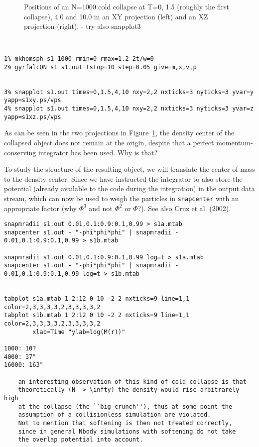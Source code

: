 {\begin{figure}[htb]
\caption[Cold Collapse of an N=1000 system]
{Positions of an N=1000 cold collapse at T=0, 1.5 (roughly
the first collapse), 4.0 and 10.0 in an XY projection (left) 
and an XZ projection (right). - try also snapplot3 }
\label{f:s1xy}
\end{figure}

\footnotesize\begin{verbatim}


1% mkhomsph s1 1000 rmin=0 rmax=1.2 2t/w=0
2% gyrfalcON s1 s1.out tstop=10 step=0.05 give=m,x,v,p


3% snapplot s1.out times=0,1.5,4,10 nxy=2,2 nxticks=3 nyticks=3 yvar=y yapp=s1xy.ps/vps
4% snapplot s1.out times=0,1.5,4,10 nxy=2,2 nxticks=3 nyticks=3 yvar=z yapp=s1xz.ps/vps

\end{verbatim}\normalsize

As can be seen in the two projections in Figure~\ref{f:s1xy}, the density center
of the collapsed object does not remain at the origin, despite that a 
perfect
momentum-conserving integrator has been used. Why is that?

To study the structure of the resulting object,
we will translate the center of mass to the density center. Since
we have instructed the integrator to also store the potential (already
available to the code during the integration) in the output data stream, which
can now be used to weigh the particles in {\tt snapcenter} with an appropriate
factor (why $\Phi^3$ and not $\Phi^2$ or $\Phi$?). See also Cruz et al. (2002).

\footnotesize\begin{verbatim}
snapmradii s1.out 0.01,0.1:0.9:0.1,0.99 > s1a.mtab
snapcenter s1.out - "-phi*phi*phi" | snapmradii - 0.01,0.1:0.9:0.1,0.99 > s1b.mtab

snapmradii s1.out 0.01,0.1:0.9:0.1,0.99 log=t > s1a.mtab
snapcenter s1.out - "-phi*phi*phi" | snapmradii - 0.01,0.1:0.9:0.1,0.99 log=t > s1b.mtab


tabplot s1a.mtab 1 2:12 0 10 -2 2 nxticks=9 line=1,1 color=2,3,3,3,3,2,3,3,3,3,2
tabplot s1b.mtab 1 2:12 0 10 -2 2 nxticks=9 line=1,1 color=2,3,3,3,3,2,3,3,3,3,2
        xlab=Time "ylab=log(M(r))"

1000: 10?
4000: 37"
16000: 163"

    an interesting observation of this kind of cold collapse is that
    theoretically (N -> \infty) the density would rise arbitrarely high
    at the collapse (the ``big crunch''), thus at some point the
    assumption of a collisionless simulation are violated.
    Not to mention that softening is then not treated correctly,
    since in general Nbody simulations with softening do not take
    the overlap potential into account.


\end{verbatim}}
